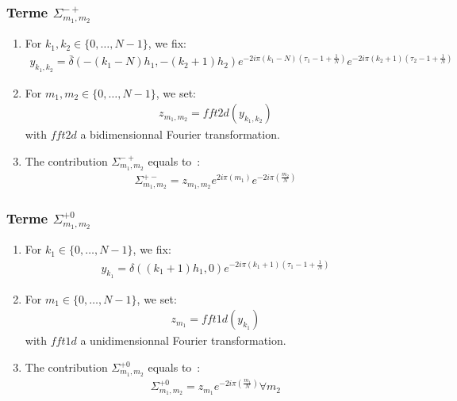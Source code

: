 \subsubsection{Terme $\Sigma_{m_1,m_2}^{-+}$}

\begin{enumerate}
\item For $k_1,k_2\in\{0,\hdots,N-1\}$, we fix:
\begin{align*}
y_{k_1,k_2}= \bar{\delta}(-(k_1-N)h_1,-(k_2+1)h_2)e^{-2i\pi (k_1-N)\left(\tau_1-1+\frac{1}{N}\right)}e^{-2i\pi (k_2+1)\left(\tau_2-1+\frac{1}{N}\right)}
\end{align*}
\item For $m_1,m_2\in\{0,\hdots,N-1\}$, we set:
\begin{align*}
  z_{m_1,m_2}=fft2d(y_{k_1,k_2})
\end{align*}
with $fft2d$ a bidimensionnal Fourier transformation.
\item The contribution $\Sigma_{m_1,m_2}^{-+}$ equals to~:
\begin{align*}
  \Sigma_{m_1,m_2}^{+-}=z_{m_1,m_2}e^{2i\pi\left(m_1\right)}e^{-2i\pi\left(\frac{m_2}{N}\right)}
\end{align*}
\end{enumerate}


\subsubsection{Terme $\Sigma_{m_1,m_2}^{+0}$}
\begin{enumerate}
\item For $k_1\in\{0,\hdots,N-1\}$, we fix:
\begin{align*}
y_{k_1}= \delta((k_1+1)h_1,0)e^{-2i\pi (k_1+1)\left(\tau_1-1+\frac{1}{N}\right)}
\end{align*}
\item For $m_1\in\{0,\hdots,N-1\}$, we set:
\begin{align*}
  z_{m_1}=fft1d(y_{k_1})
\end{align*}
with $fft1d$ a unidimensionnal Fourier transformation.
\item The contribution $\Sigma_{m_1,m_2}^{+0}$ equals to~:
\begin{align*}
  \Sigma_{m_1,m_2}^{+0}=z_{m_1}e^{-2i\pi\left(\frac{m_1}{N}\right)} \forall m_2
\end{align*}
\end{enumerate}

